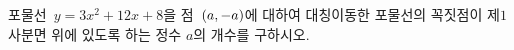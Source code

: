 포물선~$y=3x^2+12x+8$을 점~$(a{,}\mkern3mu\mathopen{}-a)$에 대하여 대칭이동한 포물선의 꼭짓점이 제$1$사분면 위에 있도록 하는 정수 $a$의 개수를 구하시오.
